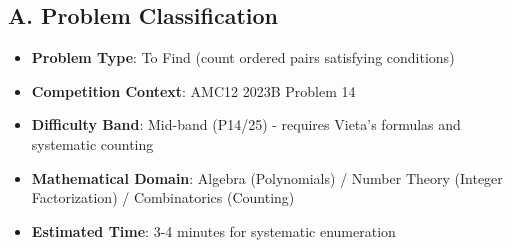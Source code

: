 \documentclass[12pt]{article}
\begin{document}
\begin{problemconfigbox}
\subsection*{A. Problem Classification}
\begin{itemize}[leftmargin=*]
    \item \textbf{Problem Type}: To Find (count ordered pairs satisfying conditions)
    \item \textbf{Competition Context}: AMC12 2023B Problem 14
    \item \textbf{Difficulty Band}: Mid-band (P14/25) - requires Vieta's formulas and systematic counting
    \item \textbf{Mathematical Domain}: Algebra (Polynomials) / Number Theory (Integer Factorization) / Combinatorics (Counting)
    \item \textbf{Estimated Time}: 3-4 minutes for systematic enumeration
\end{itemize}


\end{problemconfigbox}
\end{document}
